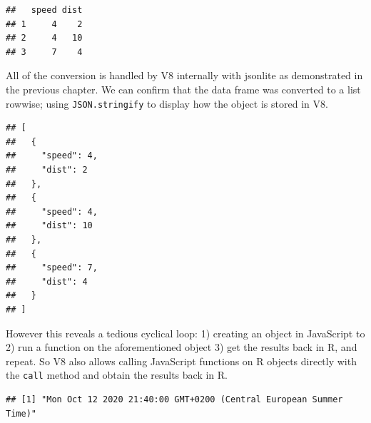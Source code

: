 \documentclass[
]{krantz}
\makeatletter
\newenvironment{Shaded}{\begin{snugshade}}{\end{snugshade}}
\newcommand{\CommentTok}[1]{\textcolor[rgb]{0.37,0.37,0.37}{\textit{#1}}}
\newcommand{\DecValTok}[1]{\textcolor[rgb]{0.06,0.06,0.06}{#1}}
\newcommand{\KeywordTok}[1]{\textcolor[rgb]{0.27,0.27,0.27}{\textbf{#1}}}
\newcommand{\NormalTok}[1]{#1}
\newcommand{\OperatorTok}[1]{\textcolor[rgb]{0.43,0.43,0.43}{\textbf{#1}}}
\newcommand{\StringTok}[1]{\textcolor[rgb]{0.5,0.5,0.5}{#1}}
\newenvironment{kframe}{%
\medskip{}
\setlength{\fboxsep}{.8em}
 \def\at@end@of@kframe{}%
 \ifinner\ifhmode%
  \def\at@end@of@kframe{\end{minipage}}%
  \begin{minipage}{\columnwidth}%
 \fi\fi%
 \def\FrameCommand##1{\hskip\@totalleftmargin \hskip-\fboxsep
 \colorbox{shadecolor}{##1}\hskip-\fboxsep
     \hskip-\linewidth \hskip-\@totalleftmargin \hskip\columnwidth}%
 \MakeFramed {\advance\hsize-\width
   \@totalleftmargin\z@ \linewidth\hsize
   \@setminipage}}%
 {\par\unskip\endMakeFramed%
 \at@end@of@kframe}
\renewenvironment{Shaded}{\begin{kframe}}{\end{kframe}}
\makeatother
\begin{document}
\begin{Shaded}
\end{Shaded}

\begin{verbatim}
##   speed dist
## 1     4    2
## 2     4   10
## 3     7    4
\end{verbatim}

All of the conversion is handled by V8 internally with jsonlite as demonstrated in the previous chapter. We can confirm that the data frame was converted to a list rowwise; using \texttt{JSON.stringify} to display how the object is stored in V8.

\begin{Shaded}
\end{Shaded}

\begin{verbatim}
## [
##   {
##     "speed": 4,
##     "dist": 2
##   },
##   {
##     "speed": 4,
##     "dist": 10
##   },
##   {
##     "speed": 7,
##     "dist": 4
##   }
## ]
\end{verbatim}

However this reveals a tedious cyclical loop: 1) creating an object in JavaScript to 2) run a function on the aforementioned object 3) get the results back in R, and repeat. So V8 also allows calling JavaScript functions on R objects directly with the \texttt{call} method and obtain the results back in R.

\begin{Shaded}
\end{Shaded}

\begin{verbatim}
## [1] "Mon Oct 12 2020 21:40:00 GMT+0200 (Central European Summer Time)"
\end{verbatim}
\end{document}

